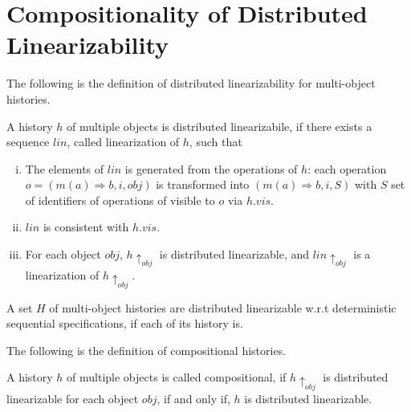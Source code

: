 
\section{Compositionality of Distributed Linearizability}
\label{sec:compositionality of distributed linearizability} 


The following is the definition of distributed linearizability for multi-object histories. 

\begin{definition}
\label{definition:distributed linearizability for multi-object histories} 
A history $h$ of multiple objects is distributed linearizabile, if there exists a sequence $\mathit{lin}$, called linearization of $h$, such that

\begin{enumerate}[(i)]
\item The elements of $\mathit{lin}$ is generated from the operations of $h$: each operation $o = (m(a) \Rightarrow b,i,\mathit{obj})$ is transformed into $(m(a) \Rightarrow b,i,S)$ with $S$ set of identifiers of operations of visible to $o$ via $h.\mathit{vis}$. 
\item $\mathit{lin}$ is consistent with $h. \mathit{vis}$.
\item For each object $\mathit{obj}$, $h \uparrow_{\mathit{obj}}$ is distributed linearizable, and $\mathit{lin} \uparrow_{ \mathit{obj} }$ is a linearization of $h \uparrow_{\mathit{obj}}$.
\end{enumerate}

A set $H$ of multi-object histories are distributed linearizable w.r.t deterministic sequential specifications, if each of its history is.
\end{definition}

The following is the definition of compositional histories. 

\begin{definition}[Compositionality]
\label{definition:compositionality}
A history $h$ of multiple objects is called compositional, if $h \uparrow_{\mathit{obj}}$ is distributed linearizable for each object $\mathit{obj}$, if and only if, $h$ is distributed linearizable. 
\end{definition} 

